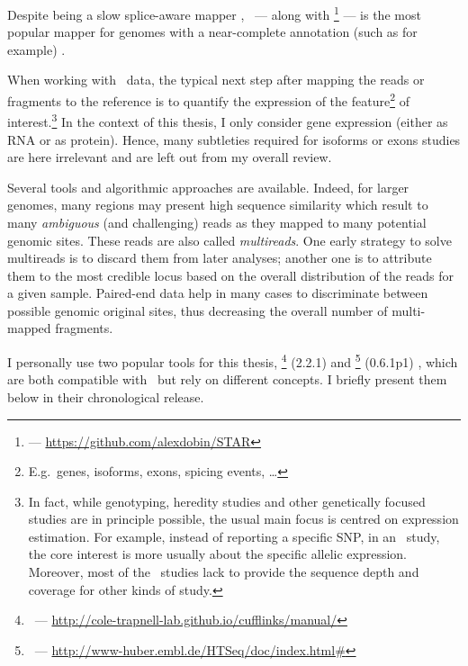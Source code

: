 Despite being a slow splice-aware mapper ,
\toph\ --- along with
\footnote{ --- \href{https://github.com/alexdobin/STAR}%
{https://github.com/alexdobin/STAR}}  --- is the most
popular mapper for genomes with a near-complete annotation (such as
 for example) .



When working with \Rnaseq\ data, the typical next step after mapping the reads or
fragments to the reference is to quantify the expression of the
feature\footnote{E.g.\ genes, isoforms, exons, spicing events, \ldots}
of interest.\footnote{In fact, while genotyping, heredity
studies and other genetically focused studies are in principle possible, the usual
main focus is centred on expression estimation. For example, instead of
reporting a specific \gls{SNP}, in an \Rnaseq\ study, the core interest is more
usually about the specific allelic expression. Moreover, most of the \Rnaseq\
studies lack to provide the sequence depth and coverage for other kinds of study.}
In the context of this thesis, I only consider gene expression (either as \gls{RNA}
or as protein). Hence, many subtleties required for isoforms or exons studies are
here irrelevant and are left out from my overall review.

Several tools and algorithmic approaches are available.
Indeed, for larger genomes, many regions may present high sequence similarity
which result to many \emph{ambiguous} (and challenging) reads as they mapped to
many potential genomic sites. These reads are also called \emph{multireads}.
One early strategy to solve multireads is to discard them from later analyses;
another one is to attribute them to the most credible locus based on
the overall distribution of the reads for a given sample. 
Paired-end data help in many cases to discriminate between possible genomic
original sites, thus decreasing the overall number of multi-mapped fragments.

I personally use two popular tools for this thesis,
\cuffl\footnote{\cuffl\ ---
\href{http://cole-trapnell-lab.github.io/cufflinks/manual/}%
{http://cole-trapnell-lab.github.io/cufflinks/manual/}} (2.2.1)
 and
\htseq\footnote{\htseq\ ---
\href{http://www-huber.embl.de/HTSeq/doc/index.html\#}%
{http://www-huber.embl.de/HTSeq/doc/index.html\#}} (0.6.1p1)
,
which are both compatible with \toph\ but rely on different concepts.
I briefly present them below in their chronological release.

